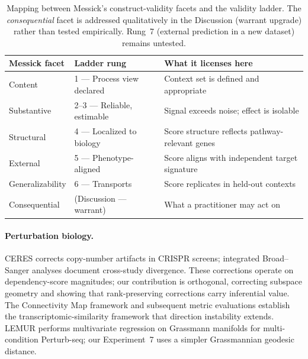 \documentclass[11pt]{article}
\begin{document}
\begin{table}[t]
\centering
\caption{Mapping between Messick's construct-validity facets and
the validity ladder.
The \emph{consequential} facet is addressed qualitatively in the
Discussion (warrant upgrade) rather than tested empirically.
Rung~7 (external prediction in a new dataset) remains untested.}
\label{tab:messick}
\small
\begin{tabular}{lll}
\toprule
Messick facet & Ladder rung & What it licenses here \\
\midrule
Content & 1 --- Process view declared & Context set is defined and appropriate \\
Substantive & 2--3 --- Reliable, estimable & Signal exceeds noise; effect is isolable \\
Structural & 4 --- Localized to biology & Score structure reflects pathway-relevant genes \\
External & 5 --- Phenotype-aligned & Score aligns with independent target signature \\
Generalizability & 6 --- Transports & Score replicates in held-out contexts \\
Consequential & (Discussion --- warrant) & What a practitioner may act on \\
\bottomrule
\end{tabular}
\end{table}

\paragraph{Perturbation biology.}
CERES \citep{meyers2017ceres} corrects copy-number artifacts in CRISPR
screens; integrated Broad--Sanger analyses \citep{pacini2021integrated}
document cross-study divergence. These corrections operate on
dependency-score magnitudes; our contribution is orthogonal, correcting
subspace geometry and showing that rank-preserving corrections carry
inferential value. The Connectivity Map framework
\citep{subramanian2017next,lamb2006connectivity} and subsequent metric
evaluations \citep{li2020comprehensive} establish the
transcriptomic-similarity framework that direction instability extends.
LEMUR \citep{ahlmanneltze2025lemur} performs multivariate regression on
Grassmann manifolds for multi-condition Perturb-seq; our Experiment~7 uses
a simpler Grassmannian geodesic distance.
\end{document}
